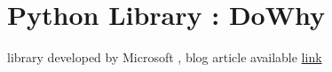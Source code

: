 \documentclass{article}
\begin{document}

\section{Python Library : DoWhy}
library developed by Microsoft \cite{dowhy}, blog article available \href{https://www.microsoft.com/en-us/research/blog/dowhy-a-library-for-causal-inference/}{link}


\newpage
\nocite{*}    %

\end{document}
